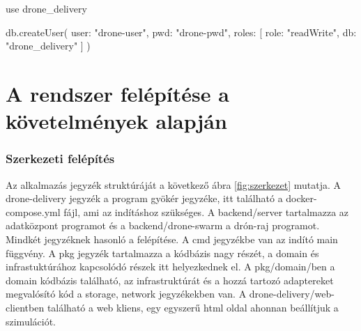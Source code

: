 \begin{python}
    use drone_delivery
\end{python}

\begin{python}

    db.createUser(
        {
        user: "drone-user",
        pwd: "drone-pwd",
        roles: [
            {
            role: "readWrite",
            db: "drone_delivery"
        }
        ]
    }
    )
\end{python}



\section{A rendszer felépítése a követelmények alapján}
\subsubsection{Szerkezeti felépítés}
Az alkalmazás jegyzék struktúráját a következő ábra \ref{fig:szerkezet} mutatja.
A drone-delivery jegyzék a program gyökér jegyzéke, itt található a docker-compose.yml fájl, ami az indításhoz szükséges.
A backend/server tartalmazza az adatközpont programot és a backend/drone-swarm a drón-raj programot.
Mindkét jegyzéknek hasonló a felépítése.
A cmd jegyzékbe van az indító main függvény.
A pkg jegyzék tartalmazza a kódbázis nagy részét, a domain és infrastuktúrához kapcsolódó részek itt helyezkednek el.
A pkg/domain/ben a domain kódbázis található, az infrastruktúrát és a hozzá tartozó adaptereket megvalósító kód a storage, network jegyzékekben van.
A drone-delivery/web-clientben található a web kliens, egy egyszerű html oldal ahonnan beállítjuk a szimulációt.

